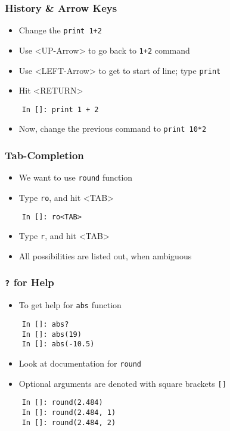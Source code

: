 \begin{frame}[fragile]
  \frametitle{History \& Arrow Keys}
  \begin{itemize}
  \item Change the \texttt{print 1+2}
  \item Use <UP-Arrow> to go back to \texttt{1+2} command
  \item Use <LEFT-Arrow> to get to start of line; type \texttt{print }
  \item Hit <RETURN>
  \end{itemize}
  \begin{lstlisting}
    In []: print 1 + 2
  \end{lstlisting}
  \begin{itemize}
  \item Now, change the previous command to \texttt{print 10*2}
  \end{itemize}
\end{frame}

\begin{frame}[fragile]
  \frametitle{Tab-Completion}
  \begin{itemize}
  \item We want to use \texttt{round} function
  \item Type \texttt{ro}, and hit <TAB>
  \end{itemize}
  \begin{lstlisting}
    In []: ro<TAB>
  \end{lstlisting}
  \begin{itemize}
  \item Type \texttt{r}, and hit <TAB>
  \item All possibilities are listed out, when ambiguous
  \end{itemize}
\end{frame}

\begin{frame}[fragile]
  \frametitle{\texttt{?} for Help}
  \begin{itemize}
  \item To get help for \texttt{abs} function
  \end{itemize}
  \begin{lstlisting}
    In []: abs?
    In []: abs(19)
    In []: abs(-10.5)
  \end{lstlisting}
  \begin{itemize}
  \item Look at documentation for \texttt{round}
  \item Optional arguments are denoted with square brackets
    \texttt{[]} 
  \end{itemize}
  \begin{lstlisting}
    In []: round(2.484)
    In []: round(2.484, 1)
    In []: round(2.484, 2)
  \end{lstlisting}
\end{frame}

